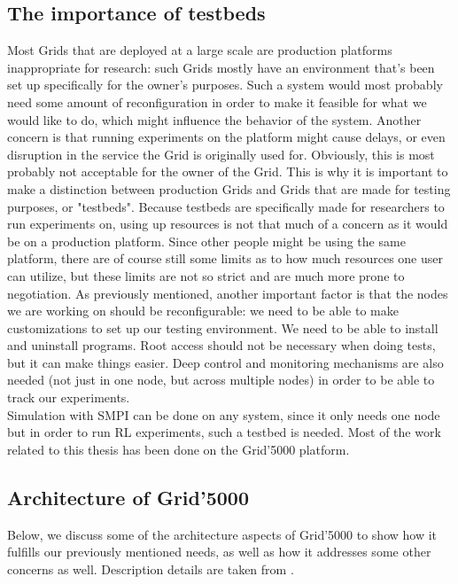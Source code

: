 \subsection{The importance of testbeds}
Most Grids that are deployed at a large scale are production platforms
inappropriate for research: such Grids mostly have an environment
that's been
set up specifically for the owner's purposes. Such a system would most
probably need some amount of reconfiguration in order to make it
feasible for what we would like to do, which might influence the
behavior of the system. Another concern is that running experiments on
the platform might cause delays, or even disruption in the
service the Grid is originally used for. Obviously, this is most
probably not acceptable for the owner of the Grid. This is why it is
important to make a distinction between production Grids and Grids
that are made for testing purposes, or "testbeds". Because testbeds
are specifically made for researchers to run experiments on, using up
resources is not that much of a concern as it would be on a production
platform. Since other people might be using the same platform, there
are of course still some limits as to how much resources one user can
utilize, but these limits are not so strict and are much more prone to
negotiation. As previously mentioned, another important factor is that
the nodes we are working on should be reconfigurable: we need to be
able to make customizations to set
up our testing environment. We need to be able to install and
uninstall programs. Root access should not be necessary when doing
tests, but it can make things easier. Deep control and monitoring
mechanisms are also needed (not just in one node, but across multiple
nodes) in order to be able to track our experiments.\\
Simulation with SMPI can be done on any system, since it only needs
one node but in order to run RL experiments, such a testbed is
needed. Most of the work related to this thesis has been done on the
Grid'5000 platform.\cite{bccddjjllmmnpqrtt06}
\subsection{Architecture of Grid'5000}
Below, we discuss some of the architecture aspects of Grid'5000 to
show how it fulfills our previously mentioned needs, as well as how it
addresses some other concerns as well. Description details are taken
from \cite{bccddjjllmmnpqrtt06}.
